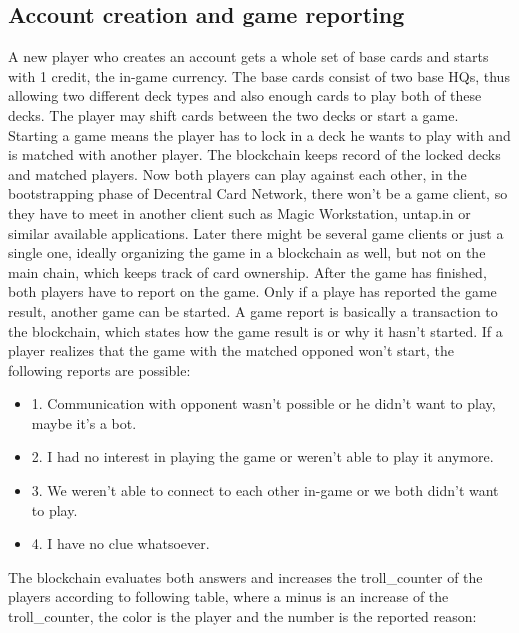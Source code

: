 \documentclass{article}
\begin{document}
\subsection{Account creation and game reporting}
%
A new player who creates an account gets a whole set of base cards and starts with 1 credit, the in-game currency. The base cards consist of two base HQs, thus allowing two different deck types and also enough cards to play both of these decks. The player may shift cards between the two decks or start a game. Starting a game means the player has to lock in a deck he wants to play with and is matched with another player. The blockchain keeps record of the locked decks and matched players. Now both players can play against each other, in the bootstrapping phase of Decentral Card Network, there won't be a game client, so they have to meet in another client such as Magic Workstation\cite{MWS}, untap.in\cite{untapin} or similar available applications. Later there might be several game clients or just a single one, ideally organizing the game in a blockchain as well, but not on the main chain, which keeps track of card ownership. After the game has finished, both players have to report on the game. Only if a playe has reported the game result, another game can be started. A game report is basically a transaction to the blockchain, which states how the game result is or why it hasn't started. If a player realizes that the game with the matched opponed won't start, the following reports are possible:
%
\begin{itemize}
	\item 1. Communication with opponent wasn't possible or he didn't want to play, maybe it's a bot.
	\item 2. I had no interest in playing the game or weren't able to play it anymore.
	\item 3. We weren't able to connect to each other in-game or we both didn't want to play.
	\item 4. I have no clue whatsoever.
\end{itemize}
%
The blockchain evaluates both answers and increases the troll\_counter of the players according to following table, where a minus is an increase of the troll\_counter, the color is the player and the number is the reported reason:
%
\end{document}
